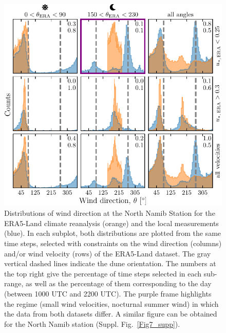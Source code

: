 \begin{figure}
\centering
\includegraphics[scale=1]{Figures/Figure3.pdf}
\caption{Distributions of wind direction at the North Namib Station for the ERA5-Land climate reanalysis (orange) and the local measurements (blue). In each subplot, both distributions are plotted from the same time steps, selected with constraints on the wind direction (columns) and/or wind velocity (rows) of the ERA5-Land dataset. The gray vertical dashed lines indicate the dune orientation. The numbers at the top right give the percentage of time steps selected in each sub-range, as well as the percentage of them corresponding to the day (between 1000 UTC and 2200 UTC). The purple frame highlights the regime (small wind velocities, nocturnal summer wind) in which the data from both datasets differ. A similar figure can be obtained for the North Namib station (Suppl. Fig.~\ref{Fig7_supp}).}
\label{Fig3}
\end{figure}


